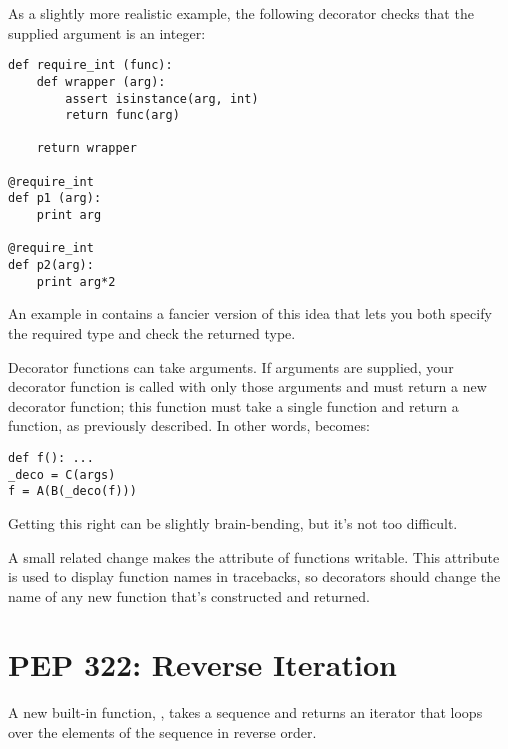 \documentclass{howto}
\begin{document}
As a slightly more realistic example, the following decorator checks
that the supplied argument is an integer:

\begin{verbatim}
def require_int (func):
    def wrapper (arg):
        assert isinstance(arg, int)
        return func(arg)

    return wrapper

@require_int
def p1 (arg):
    print arg

@require_int
def p2(arg):
    print arg*2
\end{verbatim}

An example in  contains a fancier version of this idea that
lets you both specify the required type and check the returned type.

Decorator functions can take arguments.  If arguments are supplied,
your decorator function is called with only those arguments and must
return a new decorator function; this function must take a single
function and return a function, as previously described.  In other
words,  becomes:

\begin{verbatim}
def f(): ...
_deco = C(args)
f = A(B(_deco(f)))
\end{verbatim}

Getting this right can be slightly brain-bending, but it's not too
difficult.

A small related change makes the  attribute of
functions writable.  This attribute is used to display function names
in tracebacks, so decorators should change the name of any new
function that's constructed and returned.

\begin{seealso}
\end{seealso}



\section{PEP 322: Reverse Iteration}

A new built-in function, , takes a sequence
and returns an iterator that loops over the elements of the sequence 
in reverse order.  
\end{document}
